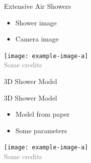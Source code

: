 \documentclass[aspectratio=1610, 9pt]{beamer}
\begin{document}
\begin{frame}{Extensive Air Showers}
    \begin{minipage}{0.49\textwidth}
        \begin{itemize}
            \item Shower image
            \item Camera image
        \end{itemize}
    \end{minipage}
    \hfill
    \begin{minipage}{0.5\textwidth}
        \centering
        \texttt{[image: example-image-a]}\\
        \tiny{{\textcolor{gray}{Some credits}}}
    \end{minipage}
\end{frame}

\begin{frame}
    \centering
\end{frame}

\begin{frame}
  \begin{center}
    \fontsize{40}{48} \selectfont\textcolor{tugreen}{3D Shower Model}
  \end{center}
\end{frame}

\begin{frame}{3D Shower Model}
    \begin{minipage}{0.49\textwidth}
        \begin{itemize}
            \item Model from paper
            \item Some parameters
        \end{itemize}
    \end{minipage}
    \hfill
    \begin{minipage}{0.5\textwidth}
        \centering
        \texttt{[image: example-image-a]}\\
        \tiny{{\textcolor{gray}{Some credits}}}
    \end{minipage}
\end{frame}
\end{document}
